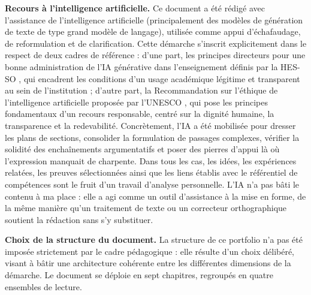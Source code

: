 \textbf{Recours à l'intelligence artificielle.}
Ce document a été rédigé avec l'assistance de l'intelligence artificielle (principalement des modèles de génération de texte de type grand modèle de langage), utilisée comme appui d'échafaudage, de reformulation et de clarification. Cette démarche s'inscrit explicitement dans le respect de deux cadres de référence : d'une part, les principes directeurs pour une bonne administration de l'IA générative dans l'enseignement définis par la HES-SO \citep{hessoIA2025}, qui encadrent les conditions d'un usage académique légitime et transparent au sein de l'institution ; d'autre part, la Recommandation sur l'éthique de l'intelligence artificielle proposée par l'UNESCO \citep{unescoIA2022}, qui pose les principes fondamentaux d'un recours responsable, centré sur la dignité humaine, la transparence et la redevabilité. Concrètement, l'IA a été mobilisée pour dresser les plans de sections, consolider la formulation de passages complexes, vérifier la solidité des enchaînements argumentatifs et poser des pierres d'appui là où l'expression manquait de charpente. Dans tous les cas, les idées, les expériences relatées, les preuves sélectionnées ainsi que les liens établis avec le référentiel de compétences sont le fruit d'un travail d'analyse personnelle. L'IA n'a pas bâti le contenu à ma place : elle a agi comme un outil d'assistance à la mise en forme, de la même manière qu'un traitement de texte ou un correcteur orthographique soutient la rédaction sans s'y substituer.

\textbf{Choix de la structure du document.}
La structure de ce portfolio n'a pas été imposée strictement par le cadre pédagogique : elle résulte d'un choix délibéré, visant à bâtir une architecture cohérente entre les différentes dimensions de la démarche. Le document se déploie en sept chapitres, regroupés en quatre ensembles de lecture.

